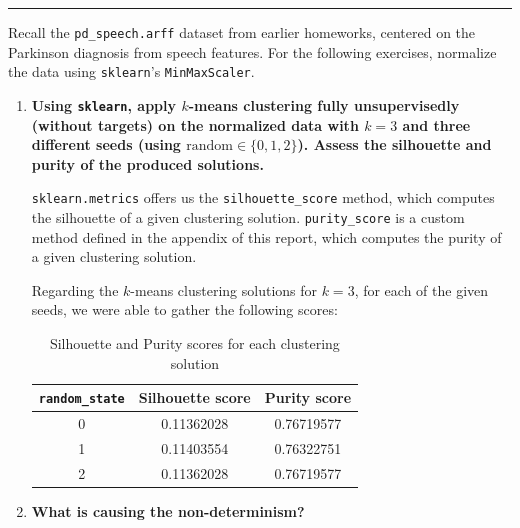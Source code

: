 \documentclass[12pt]{article}
\begin{document}
\hrule \vspace*{0.5cm}

Recall the \texttt{pd\_speech.arff} dataset from earlier homeworks, centered on
the Parkinson diagnosis from speech features. For the following exercises, normalize
the data using \texttt{sklearn}'s \texttt{MinMaxScaler}.

\begin{enumerate}[leftmargin=\labelsep,resume]

  \item \textbf{Using \texttt{sklearn}, apply $k$-means clustering fully unsupervisedly
          (without targets) on the normalized data with $k = 3$ and three different seeds
          (using $\text{random} \in \{0, 1, 2\}$). Assess the silhouette and purity of the produced solutions.}

        \texttt{sklearn.metrics} offers us the \texttt{silhouette\_score} method, which
        computes the silhouette of a given clustering solution.
        \texttt{purity\_score} is a custom method defined in the appendix of this report,
        which computes the purity of a given clustering solution.

        Regarding the $k$-means clustering solutions for $k = 3$, for each of the
        given seeds, we were able to gather the following scores:

        \begin{table}[H]
          \centering
          \begin{tabular}{c|c|c}
            \textbf{\texttt{random\_state}} & \textbf{Silhouette score} & \textbf{Purity score} \\ \hline
            0                               & 0.11362028                & 0.76719577            \\
            1                               & 0.11403554                & 0.76322751            \\
            2                               & 0.11362028                & 0.76719577            \\
          \end{tabular}
          \caption{Silhouette and Purity scores for each clustering solution}
          \label{tab:clustering-solutions-scores}
        \end{table}


  \item \textbf{What is causing the non-determinism?}


\end{enumerate}
\end{document}
